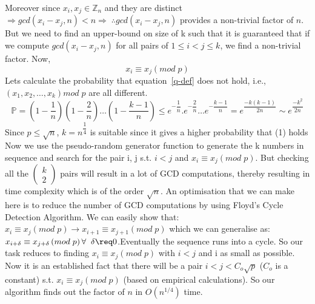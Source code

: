 \documentclass[11pt]{article}
\begin{document}
\begin{flushleft}
        Moreover since $x_{i}, x_{j} \in \mathbb{Z}_{n}$ and they are distinct $\Rightarrow gcd\left( x_{i}-x_{j},n\right) < n \Rightarrow \; \therefore gcd\left( x_{i}-x_{j},n\right)$ provides a non-trivial factor of $n$. \break
        But we need to find an upper-bound on size of k such that it is guaranteed that if we compute $gcd\left( x_{i}-x_{j},n\right)$ for all pairs of $1 \leq i < j \leq k$, we find a non-trivial factor. \break
        Now, 
        \begin{equation}
          \label{q-def}
         x_{i}\equiv x_{j}\left( mod \; p\right)
        \end{equation}
        Lets calculate the probability that equation~\eqref{q-def} does not hold, i.e., $\left( x_{1},x_{2},\ldots ,x_{k}\right) mod \; p $ are all different.
        \begin{equation}
        \mathbb{P} = \left( 1-\dfrac {1}{n}\right) \left( 1-\dfrac {2}{n}\right) \ldots \left( 1-\dfrac {k-1}{n}\right) 
        \leq e^{-\dfrac {1}{n}}.e^{-\dfrac {2}{n}}\ldots e^{-\dfrac {k-1}{n}}=e^{\dfrac {-k\left( k-1\right) }{2n}} \sim e^{\dfrac {-k^{2}}{2n}}
        \end{equation}
        Since $p \leq \sqrt{n}$, $k = n^{\dfrac {1}{4}}$ is suitable since it gives a higher probability that (1) holds\\
        Now we use the pseudo-random generator function to generate the k numbers in sequence and search for the pair i, j s.t. $i < j$ and $x_{i} \equiv x_{j} \left( mod \; p \right). $ But checking all the $\begin{pmatrix}
        k \\ 2 \end{pmatrix}$ pairs will result in a lot of GCD computations, thereby resulting in time complexity which is of the order $\sqrt {n}$. \break \break
        An optimisation that we can make here is to reduce the number of GCD computations by using Floyd's Cycle Detection Algorithm. We can easily show that: $x_{i} \equiv x_{j} \left( mod \; p \right) \rightarrow x_{i+1} \equiv x_{j+1} \left( mod \; p \right)$ which we can generalise as: $x_{i+\delta} \equiv x_{j+\delta} \left( mod \; p \right) \forall \; \; \delta \req 0 $.\break Eventually the sequence runs into a cycle. So our task reduces to finding  $x_{i} \equiv x_{j} \left( mod \; p \right)$ with $i < j$ and i as small as possible. \break
        Now it is an established fact that there will be a pair $i < j < C_{o}\sqrt{p}$ \quad ($C_{o}$ is a constant) s.t. $x_{i} \equiv x_{j} \left( mod \; p \right)$ (based on empirical calculations). So our algorithm finds out the factor of $n$ in $O\left( n^{1/4}\right)$ time.

\end{flushleft}
\end{document}
